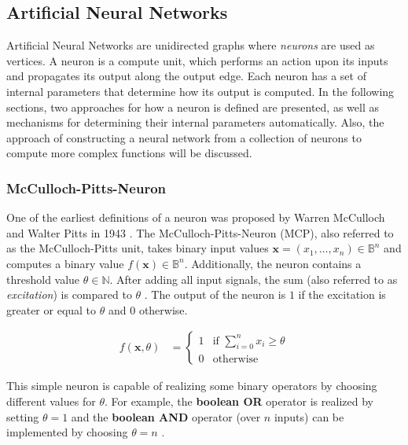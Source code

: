 \subsection{Artificial Neural Networks}
Artificial Neural Networks are unidirected graphs where \textit{neurons} are used as vertices.
A neuron is a compute unit, which performs an action upon its inputs and propagates its output along the output edge.
Each neuron has a set of internal parameters that determine how its output is computed.
In the following sections, two approaches for how a neuron is defined are presented, as well as mechanisms for determining their internal parameters automatically.
Also, the approach of constructing a neural network from a collection of neurons to compute more complex functions will be discussed.

\subsubsection{McCulloch-Pitts-Neuron}
\label{sec:mcculloch-pitts}
One of the earliest definitions of a neuron was proposed by Warren McCulloch and Walter Pitts in 1943 \cite{mcculloch_logical_1943}.
The McCulloch-Pitts-Neuron (MCP), also referred to as the McCulloch-Pitts unit, takes binary input values $\bm{x} = (x_1, \dots, x_n) \in \mathbb{B}^n$ and computes a binary value $f(\bm{x}) \in \mathbb{B}^n$.
Additionally, the neuron contains a threshold value $\theta \in \mathbb{N}$.
After adding all input signals, the sum (also referred to as \textit{excitation}) is compared to $\theta$ .
The output of the neuron is $1$ if the excitation is greater or equal to $\theta$ and $0$ otherwise.

\begin{equation}
    \begin{split}
        \label{eq:mcculloch-binary}
        f(\bm{x}, \theta)
        &=
        \begin{cases}
            1 & \text{if } \sum_{i=0}^n x_i \geq \theta \\
            0 & \text{otherwise}
        \end{cases}
    \end{split}
\end{equation}

This simple neuron is capable of realizing some binary operators by choosing different values for $\theta$.
For example, the \textbf{boolean OR} operator is realized by setting $\theta = 1$ and the \textbf{boolean AND} operator (over $n$ inputs) can be implemented by choosing $\theta = n$ \cite{rojas_neural_1996}.


